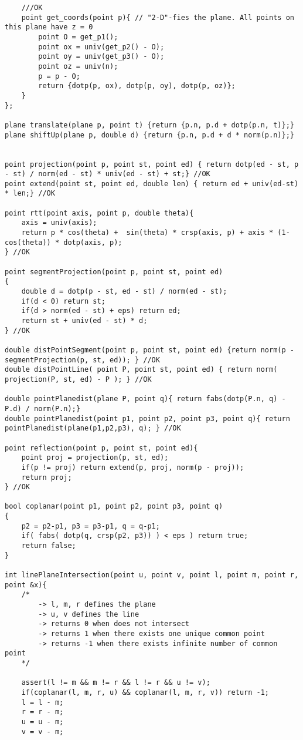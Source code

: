 \documentclass[10pt,a4paper,onesided]{article}
\begin{document}
\begin{multicols*}{3}
\begin{lstlisting}
    ///OK
    point get_coords(point p){ // "2-D"-fies the plane. All points on this plane have z = 0
        point O = get_p1();
        point ox = univ(get_p2() - O);
        point oy = univ(get_p3() - O);
        point oz = univ(n);
        p = p - O;
        return {dotp(p, ox), dotp(p, oy), dotp(p, oz)};
    }
};

plane translate(plane p, point t) {return {p.n, p.d + dotp(p.n, t)};}
plane shiftUp(plane p, double d) {return {p.n, p.d + d * norm(p.n)};}


point projection(point p, point st, point ed) { return dotp(ed - st, p - st) / norm(ed - st) * univ(ed - st) + st;} //OK
point extend(point st, point ed, double len) { return ed + univ(ed-st) * len;} //OK

point rtt(point axis, point p, double theta){
    axis = univ(axis);
    return p * cos(theta) +  sin(theta) * crsp(axis, p) + axis * (1-cos(theta)) * dotp(axis, p);
} //OK

point segmentProjection(point p, point st, point ed)
{
    double d = dotp(p - st, ed - st) / norm(ed - st);
    if(d < 0) return st;
    if(d > norm(ed - st) + eps) return ed;
    return st + univ(ed - st) * d;
} //OK

double distPointSegment(point p, point st, point ed) {return norm(p - segmentProjection(p, st, ed)); } //OK
double distPointLine( point P, point st, point ed) { return norm( projection(P, st, ed) - P ); } //OK

double pointPlanedist(plane P, point q){ return fabs(dotp(P.n, q) - P.d) / norm(P.n);}
double pointPlanedist(point p1, point p2, point p3, point q){ return pointPlanedist(plane(p1,p2,p3), q); } //OK

point reflection(point p, point st, point ed){
    point proj = projection(p, st, ed);
    if(p != proj) return extend(p, proj, norm(p - proj));
    return proj;
} //OK

bool coplanar(point p1, point p2, point p3, point q)
{
    p2 = p2-p1, p3 = p3-p1, q = q-p1;
    if( fabs( dotp(q, crsp(p2, p3)) ) < eps ) return true;
    return false;
}

int linePlaneIntersection(point u, point v, point l, point m, point r, point &x){
    /*
        -> l, m, r defines the plane
        -> u, v defines the line
        -> returns 0 when does not intersect
        -> returns 1 when there exists one unique common point
        -> returns -1 when there exists infinite number of common point
    */

    assert(l != m && m != r && l != r && u != v);
    if(coplanar(l, m, r, u) && coplanar(l, m, r, v)) return -1;
    l = l - m;
    r = r - m;
    u = u - m;
    v = v - m;


\end{lstlisting}
\end{multicols*}
\end{document}
